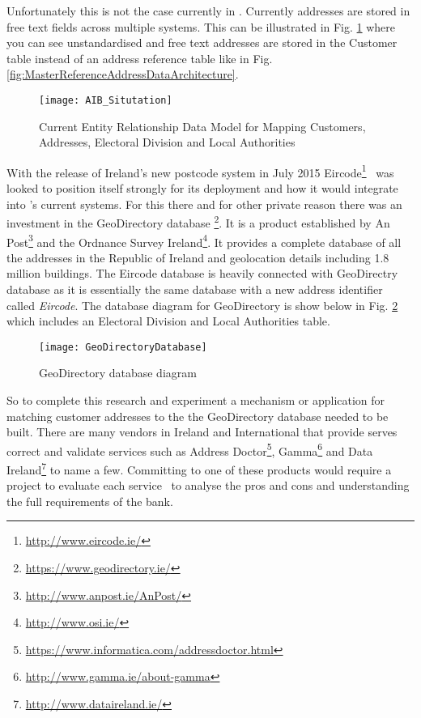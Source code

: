 Unfortunately this is not the case currently in \subjectname. Currently addresses are stored in free text fields across multiple systems. This can be illustrated in Fig. \ref{fig:AIB_Situtation} where you can see unstandardised and free text addresses are stored in the Customer table instead of an address reference table like in Fig. \ref{fig:MasterReferenceAddressDataArchitecture}.

\begin{figure}[H]
	\texttt{[image: AIB\_Situtation]}
	\caption{Current Entity Relationship Data Model for Mapping Customers, Addresses, Electoral Division and Local Authorities}
	\label{fig:AIB_Situtation}
\end{figure}

With the release of Ireland's new postcode system in July 2015 Eircode\footnote{\url{http://www.eircode.ie/}} \subjectname\ was looked to position itself strongly for its deployment and how it would integrate into \subjectname's current systems. For this there and for other private reason there was an investment in the GeoDirectory database \footnote{\url{https://www.geodirectory.ie/}}. It is a product established by An Post\footnote{\url{http://www.anpost.ie/AnPost/}} and the Ordnance Survey Ireland\footnote{\url{http://www.osi.ie/}}. It provides a complete database of all the addresses in the Republic of Ireland and geolocation details including 1.8 million buildings. The Eircode database is heavily connected with GeoDirectry database as it is essentially the same database with a new address identifier called \textit{Eircode}. The database diagram for GeoDirectory is show below in Fig. \ref{fig:GeoDirectoryDatabase} which includes an Electoral Division and Local Authorities table.

\begin{figure}[H]
	\texttt{[image: GeoDirectoryDatabase]}
	\caption{GeoDirectory database diagram}
	\label{fig:GeoDirectoryDatabase}
\end{figure}

So to complete this research and experiment a mechanism or application for matching customer addresses to the the GeoDirectory database needed to be built. There are many vendors in Ireland and International that provide serves correct and validate services such as Address Doctor\footnote{\url{https://www.informatica.com/addressdoctor.html}}, Gamma\footnote{\url{http://www.gamma.ie/about-gamma}} and Data Ireland\footnote{\url{http://www.dataireland.ie/}} to name a few. Committing to one of these products would require a project to evaluate each service \subjectname\ to analyse the pros and cons and understanding the full requirements of the bank.

